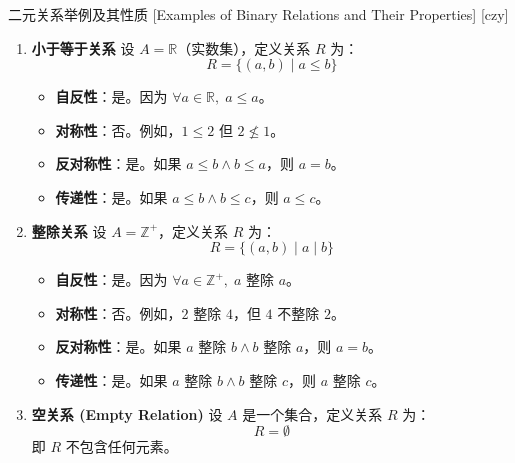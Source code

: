 \documentclass[UTF8]{ctexart}
\begin{document}
        \begin{xmp}
            [UUID]
            {二元关系举例及其性质}
            [Examples of Binary Relations and Their Properties]
            [czy]
            \begin{enumerate}
                \item \textbf{小于等于关系}
                    设 \( A = \mathbb{R} \)（实数集），定义关系 \( R \) 为：
                    \[
                    R = \{ (a, b) \mid a \leq b \}
                    \]

                    \begin{itemize}
                        \item \textbf{自反性}：是。因为 \( \forall a \in \mathbb{R}, \; a \leq a \)。
                        \item \textbf{对称性}：否。例如，\( 1 \leq 2 \) 但 \( 2 \nleq 1 \)。
                        \item \textbf{反对称性}：是。如果 \( a \leq b \land b \leq a \)，则 \( a = b \)。
                        \item \textbf{传递性}：是。如果 \( a \leq b \land b \leq c \)，则 \( a \leq c \)。
                    \end{itemize}
                \item \textbf{整除关系}
                    设 \( A = \mathbb{Z}^+ \)，定义关系 \( R \) 为：
                    \[
                    R = \{ (a, b) \mid a \mid b \}
                    \]
                    
                    \begin{itemize}
                        \item \textbf{自反性}：是。因为 \( \forall a \in \mathbb{Z}^+, \; a \) 整除 \( a \)。
                        \item \textbf{对称性}：否。例如，\( 2 \) 整除 \( 4 \)，但 \( 4 \) 不整除 \( 2 \)。
                        \item \textbf{反对称性}：是。如果 \( a \) 整除 \( b \land b \) 整除 \( a \)，则 \( a = b \)。
                        \item \textbf{传递性}：是。如果 \( a \) 整除 \( b \land b \) 整除 \( c \)，则 \( a \) 整除 \( c \)。
                    \end{itemize}
                \item \textbf{空关系 (Empty Relation)}
                设 \( A \) 是一个集合，定义关系 \( R \) 为：
                \[
                R = \emptyset
                \]
                即 \( R \) 不包含任何元素。
                

\end{enumerate}
\end{xmp}
\end{document}
